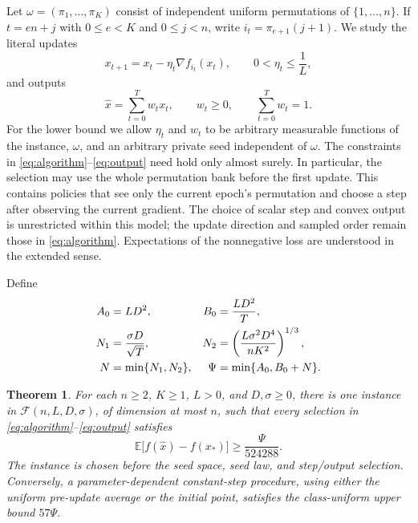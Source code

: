 \documentclass[11pt]{article}
\newtheorem{theorem}{Theorem}
\theoremstyle{remark}
\newcommand{\E}{\mathbb E}
\newcommand{\Class}{\mathcal F}
\begin{document}
Let $\omega=(\pi_1,\ldots,\pi_K)$ consist of independent uniform
permutations of $\{1,\ldots,n\}$. If $t=en+j$ with $0\le e<K$ and
$0\le j<n$, write $i_t=\pi_{e+1}(j+1)$. We study the literal updates
\begin{equation}\label{eq:algorithm}
 x_{t+1}=x_t-\eta_t\nabla f_{i_t}(x_t),\qquad
 0<\eta_t\le\frac1L,
\end{equation}
and outputs
\begin{equation}\label{eq:output}
 \widehat x=\sum_{t=0}^T w_t x_t,
 \qquad w_t\ge0,\qquad \sum_{t=0}^T w_t=1.
\end{equation}
For the lower bound we allow $\eta_t$ and $w_t$ to be arbitrary
measurable functions of the instance, $\omega$, and an arbitrary private
seed independent of $\omega$. The constraints in
\eqref{eq:algorithm}--\eqref{eq:output} need hold only almost surely.
In particular, the selection may use the whole permutation bank before
the first update. This contains policies that see only the current
epoch's permutation and choose a step after observing the current
gradient. The choice of scalar step and convex output is unrestricted
within this model; the update direction and sampled order remain those
in \eqref{eq:algorithm}. Expectations of the nonnegative loss are
understood in the extended sense.

Define
\begin{align}
 A_0&=LD^2,& B_0&=\frac{LD^2}{T},\notag\\
 N_1&=\frac{\sigma D}{\sqrt T},&
 N_2&=\left(\frac{L\sigma^2D^4}{nK^2}\right)^{1/3},\label{eq:rates}\\
 N&=\min\{N_1,N_2\},&
 \Psi&=\min\{A_0,B_0+N\}.\notag
\end{align}

\begin{theorem}\label{thm:main}
For each $n\ge2$, $K\ge1$, $L>0$, and $D,\sigma\ge0$, there is one
instance in $\Class(n,L,D,\sigma)$, of dimension at most $n$, such that
every selection in \eqref{eq:algorithm}--\eqref{eq:output} satisfies
\begin{equation}\label{eq:lower}
 \E\bigl[f(\widehat x)-f(x_*)\bigr]\ge\frac{\Psi}{524288}.
\end{equation}
The instance is chosen before the seed space, seed law, and step/output
selection. Conversely, a parameter-dependent constant-step procedure,
using either the uniform pre-update average or the initial point,
satisfies the class-uniform upper bound $57\Psi$.
\end{theorem}
\end{document}

